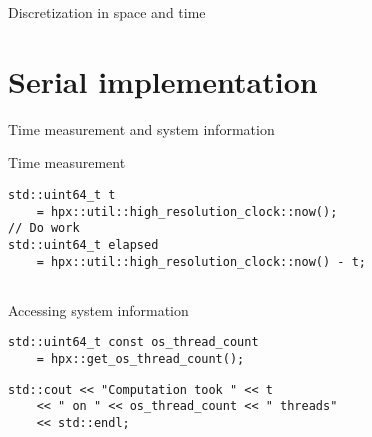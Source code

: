 \documentclass[12pt,t]{beamer}
\begin{document}
\begin{frame}{Discretization in space and time}

\begin{center}
\end{center}

\end{frame}

\section{Serial implementation}

\begin{frame}[fragile]{Time measurement and system information}

\begin{block}{Time measurement}
\begin{lstlisting}
std::uint64_t t 
	= hpx::util::high_resolution_clock::now();
// Do work 
std::uint64_t elapsed 
	= hpx::util::high_resolution_clock::now() - t;


\end{lstlisting}
\end{block}

\begin{block}{Accessing system information}
\begin{lstlisting}
std::uint64_t const os_thread_count 
	= hpx::get_os_thread_count();
\end{lstlisting}
\end{block}

\begin{lstlisting}
std::cout << "Computation took " << t 
	<< " on " << os_thread_count << " threads" 
	<< std::endl;
\end{lstlisting}

\end{frame}
\end{document}
